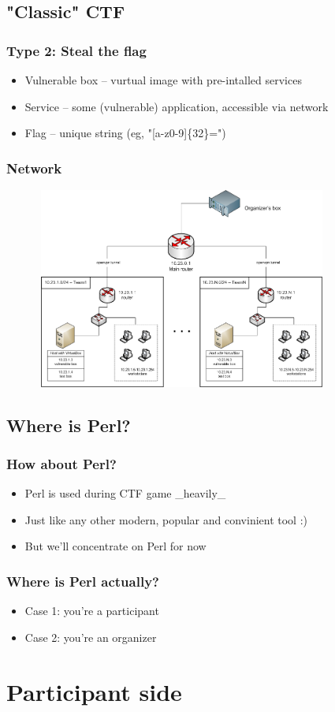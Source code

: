 \documentclass{beamer}
\begin{document}
\subsection{"Classic" CTF}
\frame
{
\frametitle{Type 2: Steal the flag}
\begin{itemize}
\item Vulnerable box -- vurtual image with pre-intalled services
\item Service -- some (vulnerable) application, accessible via network
\item Flag -- unique string (eg, "[a-z0-9]\{32\}=")
\end{itemize}
}

\frame
{
\frametitle{Network}
\begin{figure}
\includegraphics[width=3.8in,height=2.6in]{pics/network.png}
\end{figure}
}

\subsection{Where is Perl?}
\frame
{
\frametitle{How about Perl?}
\begin{itemize}
\item<1-> Perl is used during CTF game \_heavily\_
\item<2-> Just like any other modern, popular and convinient tool :)
\item<3-> But we'll concentrate on Perl for now
\end{itemize}
}

\frame
{
\frametitle{Where is Perl actually?}
\begin{itemize}
\item Case 1: you're a participant
\item Case 2: you're an organizer
\end{itemize}
}

\section{Participant side}
\end{document}
